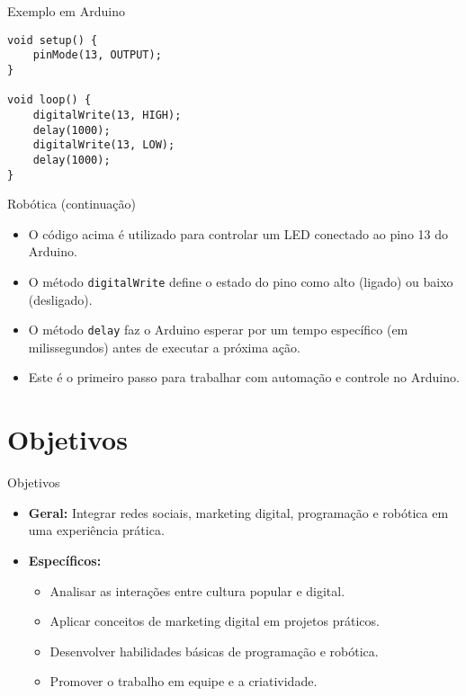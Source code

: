 \documentclass{beamer}
\begin{document}
\begin{frame}[fragile]{Exemplo em Arduino}
\begin{verbatim}
void setup() {
    pinMode(13, OUTPUT);
}

void loop() {
    digitalWrite(13, HIGH);
    delay(1000);
    digitalWrite(13, LOW);
    delay(1000);
}
\end{verbatim}
\end{frame}

\begin{frame}{Robótica (continuação)}
    \begin{itemize}
        \item O código acima é utilizado para controlar um LED conectado ao pino 13 do Arduino.
        \item O método \texttt{digitalWrite} define o estado do pino como alto (ligado) ou baixo (desligado).
        \item O método \texttt{delay} faz o Arduino esperar por um tempo específico (em milissegundos) antes de executar a próxima ação.
        \item Este é o primeiro passo para trabalhar com automação e controle no Arduino.
    \end{itemize}
\end{frame}

\section{Objetivos}
\begin{frame}{Objetivos}
    \begin{itemize}
        \item \textbf{Geral:} Integrar redes sociais, marketing digital, programação e robótica em uma experiência prática.
        \item \textbf{Específicos:}
        \begin{itemize}
            \item Analisar as interações entre cultura popular e digital.
            \item Aplicar conceitos de marketing digital em projetos práticos.
            \item Desenvolver habilidades básicas de programação e robótica.
            \item Promover o trabalho em equipe e a criatividade.
        \end{itemize}
    \end{itemize}
\end{frame}
\end{document}
